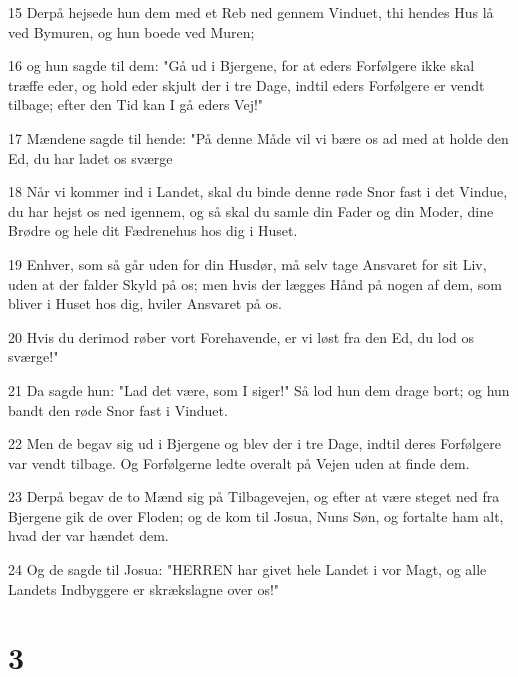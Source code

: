 \par 15 Derpå hejsede hun dem med et Reb ned gennem Vinduet, thi hendes Hus lå ved Bymuren, og hun boede ved Muren;
\par 16 og hun sagde til dem: "Gå ud i Bjergene, for at eders Forfølgere ikke skal træffe eder, og hold eder skjult der i tre Dage, indtil eders Forfølgere er vendt tilbage; efter den Tid kan I gå eders Vej!"
\par 17 Mændene sagde til hende: "På denne Måde vil vi bære os ad med at holde den Ed, du har ladet os sværge
\par 18 Når vi kommer ind i Landet, skal du binde denne røde Snor fast i det Vindue, du har hejst os ned igennem, og så skal du samle din Fader og din Moder, dine Brødre og hele dit Fædrenehus hos dig i Huset.
\par 19 Enhver, som så går uden for din Husdør, må selv tage Ansvaret for sit Liv, uden at der falder Skyld på os; men hvis der lægges Hånd på nogen af dem, som bliver i Huset hos dig, hviler Ansvaret på os.
\par 20 Hvis du derimod røber vort Forehavende, er vi løst fra den Ed, du lod os sværge!"
\par 21 Da sagde hun: "Lad det være, som I siger!" Så lod hun dem drage bort; og hun bandt den røde Snor fast i Vinduet.
\par 22 Men de begav sig ud i Bjergene og blev der i tre Dage, indtil deres Forfølgere var vendt tilbage. Og Forfølgerne ledte overalt på Vejen uden at finde dem.
\par 23 Derpå begav de to Mænd sig på Tilbagevejen, og efter at være steget ned fra Bjergene gik de over Floden; og de kom til Josua, Nuns Søn, og fortalte ham alt, hvad der var hændet dem.
\par 24 Og de sagde til Josua: "HERREN har givet hele Landet i vor Magt, og alle Landets Indbyggere er skrækslagne over os!"

\chapter{3}

